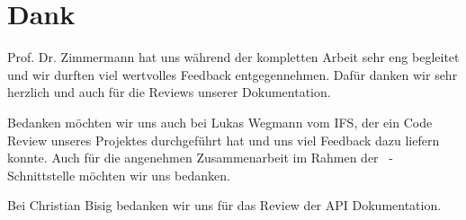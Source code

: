 \section*{Dank}

	Prof. Dr. Zimmermann hat uns während der kompletten Arbeit sehr eng begleitet und wir durften viel wertvolles Feedback entgegennehmen.
	Dafür danken wir sehr herzlich und auch für die Reviews unserer Dokumentation.
	
	Bedanken möchten wir uns auch bei Lukas Wegmann vom IFS,
	der ein Code Review unseres Projektes durchgeführt hat und uns viel Feedback dazu liefern konnte.
	Auch für die angenehmen Zusammenarbeit im Rahmen der \dks\ -Schnittstelle möchten wir uns bedanken.
	
	Bei Christian Bisig bedanken wir uns für das Review der API Dokumentation.
	
	